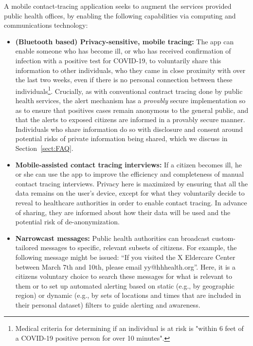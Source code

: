 \documentclass{article}
\begin{document}
A mobile contact-tracing application seeks to augment the services provided public health offices, by enabling the following capabilities via computing and communications technology:

\begin{itemize}
\item \textbf{(Bluetooth based) Privacy-sensitive, mobile tracing:}  The app can enable someone who has become ill, or who has received confirmation of infection with a positive test for COVID-19, to voluntarily share this information to other individuals, who they came in close proximity with over the last two weeks, even if there is no personal connection between these individuals\footnote{Medical criteria for determining if an individual is at risk is "within 6 feet of a COVID-19 positive person for over 10 minutes".}.  Crucially, as with conventional contract tracing done by public health services, the alert mechanism has a \emph{provably} secure implementation so as to ensure that positives cases remain anonymous to the general public, and that the alerts to exposed citizens are informed in a provably secure manner. Individuals who share information do so with disclosure and consent around potential risks of private information being shared, which we discuss in Section~\ref{sect:FAQ}. 


\item \textbf{Mobile-assisted contact tracing interviews:}  If a citizen becomes ill, he or she can use the app to improve the efficiency and completeness of manual contact tracing interviews. Privacy here is maximized by ensuring that all the data remains on the user's device, except for what they voluntarily decide to reveal to healthcare authorities in order to enable contact tracing. In advance of sharing, they are informed about how their data will be used and the potential risk of de-anonymization.

\item \textbf{Narrowcast messages:}  Public health authorities can broadcast
  custom-tailored messages to specific, relevant subsets of citizens.  For example, the following message might be issued: ``If you visited
  the X Eldercare Center between March 7th and 10th, please email yy@hhhealth.org''.  Here, it is a citizens voluntary choice to search these messages for what is relevant to them or to set up automated alerting based on static (e.g., by geographic region) or dynamic (e.g., by sets of locations and times that are included in their personal dataset) filters to guide alerting and awareness.
  
\end{itemize}
\end{document}
